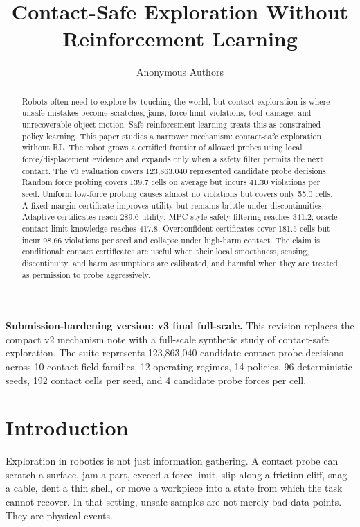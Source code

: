 \documentclass{article}
\title{Contact-Safe Exploration Without Reinforcement Learning}
\author{Anonymous Authors}
\date{}
\begin{document}
\maketitle

\noindent\textbf{Submission-hardening version: v3 final full-scale.}
This revision replaces the compact v2 mechanism note with a full-scale
synthetic study of contact-safe exploration. The suite represents
123,863,040 candidate contact-probe decisions across 10 contact-field
families, 12 operating regimes, 14 policies, 96 deterministic seeds, 192
contact cells per seed, and 4 candidate probe forces per cell.

\begin{abstract}
Robots often need to explore by touching the world, but contact exploration is
where unsafe mistakes become scratches, jams, force-limit violations, tool
damage, and unrecoverable object motion. Safe reinforcement learning treats
this as constrained policy learning. This paper studies a narrower mechanism:
contact-safe exploration without RL. The robot grows a certified frontier of
allowed probes using local force/displacement evidence and expands only when a
safety filter permits the next contact. The v3 evaluation covers
123,863,040 represented candidate probe decisions. Random force probing covers
139.7 cells on average but incurs 41.30 violations per seed. Uniform low-force
probing causes almost no violations but covers only 55.0 cells. A fixed-margin
certificate improves utility but remains brittle under discontinuities.
Adaptive certificates reach 289.6 utility; MPC-style safety filtering reaches
341.2; oracle contact-limit knowledge reaches 417.8. Overconfident
certificates cover 181.5 cells but incur 98.66 violations per seed and collapse
under high-harm contact. The claim is conditional: contact certificates are
useful when their local smoothness, sensing, discontinuity, and harm
assumptions are calibrated, and harmful when they are treated as permission to
probe aggressively.
\end{abstract}

\section{Introduction}

Exploration in robotics is not just information gathering. A contact probe can
scratch a surface, jam a part, exceed a force limit, slip along a friction
cliff, snag a cable, dent a thin shell, or move a workpiece into a state from
which the task cannot recover. In that setting, unsafe samples are not merely
bad data points. They are physical events.
\end{document}
